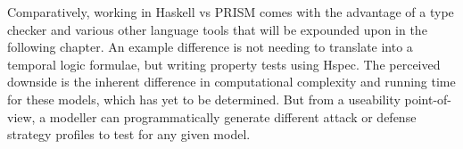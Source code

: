 Comparatively, working in Haskell vs PRISM comes with the advantage of a type checker and various other language tools that will be expounded upon in the following chapter. An example difference is not needing to translate into a temporal logic formulae, but writing property tests using Hspec. The perceived downside is the inherent difference in computational complexity and running time for these models, which has yet to be determined. But from a useability point-of-view, a modeller can programmatically generate different attack or defense strategy profiles to test for any given model. 



% 	
% 	
% 	
% 	
% 	

